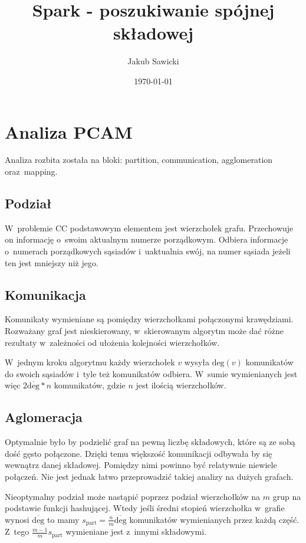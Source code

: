 \documentclass[a4paper; 12pt]{article}
\title{Spark - poszukiwanie spójnej składowej}
\author{Jakub Sawicki}
\date{\today}
\begin{document}
\renewcommand{\figurename}{Rys.}
\renewcommand{\tablename}{Tab.}
\renewcommand{\abstractname}{Abstrakt}

\maketitle

\section{Analiza PCAM}

Analiza rozbita została na bloki: partition, communication, agglomeration oraz~mapping.~\cite{foster}

\subsection{Podział}
W~problemie CC podstawowym elementem jest wierzchołek grafu.
Przechowuje on informację o~swoim aktualnym numerze porządkowym.
Odbiera informacje o~numerach porządkowych sąsiadów i~uaktualnia swój, na numer
sąsiada jeżeli ten jest mniejszy niż jego.

\subsection{Komunikacja}
Komunikaty wymieniane są pomiędzy wierzchołkami połączonymi krawędziami.
Rozważany graf jest nieskierowany, w~skierowanym algorytm może dać różne
rezultaty w~zależności od ułożenia kolejności wierzchołków.

W~jednym kroku algorytmu każdy wierzchołek $v$ wysyła $\text{deg}(v)$ komunikatów
do swoich sąsiadów i~tyle też komunikatów odbiera.
W~sumie wymienianych jest więc $2\overline{\text{deg}} * n$ komunikatów,
gdzie $n$ jest ilością wierzchołków.

\subsection{Aglomeracja}
Optymalnie było by podzielić graf na pewną liczbę składowych, które są ze sobą
dość gęsto połączone.
Dzięki temu większość komunikacji odbywała by się wewnątrz danej składowej.
Pomiędzy nimi powinno być relatywnie niewiele połączeń.
Nie jest jednak łatwo przeprowadzić takiej analizy na dużych grafach.

Nieoptymalny podział może nastąpić poprzez podział wierzchołków na $m$ grup na
podstawie funkcji hashującej.
Wtedy jeśli średni stopień wierzchołka w~grafie wynosi $\overline{\text{deg}}$
to mamy $s_{\text{part}} = \frac{n}{m} \overline{\text{deg}}$ komunikatów
wymienianych przez każdą część.
Z~tego $\frac{m-1}{m} s_{\text{part}}$ wymieniane jest z~innymi składowymi.
\end{document}
